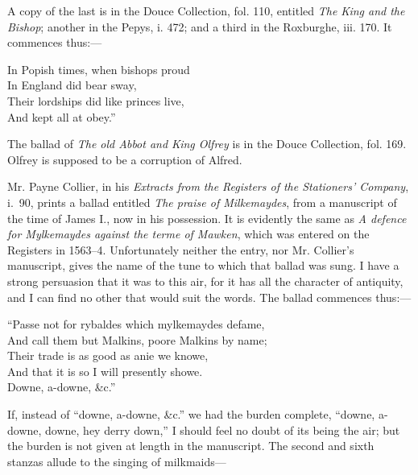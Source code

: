 A copy of the last is in the Douce Collection, fol. 110, entitled \textit{The King and
the Bishop}; another in the Pepys, i. 472; and a third in the Roxburghe, iii. 170.
It commences thus:—
\settowidth{\versewidth}{In Popish times, when bishops proud}
\begin{scverse}
\begin{altverse}
In Popish times, when bishops proud\\
In England did bear sway,\\
Their lordships did like princes live,\\
And kept all at obey.”
\end{altverse}
\end{scverse}

The ballad of \textit{The old Abbot and King Olfrey} is in the Douce Collection, fol. 169.
Olfrey is supposed to be a corruption of Alfred.

Mr. Payne Collier, in his \textit{Extracts from the Registers of the Stationers’
Company}, i.~90, prints a ballad entitled \textit{The praise of Milkemaydes}, from
a manuscript of the time of James I., now in his possession. It is evidently the
same as \textit{A defence for Mylkemaydes against the terme of Mawken}, which was
entered on the Registers in 1563–4. Unfortunately neither the entry, nor Mr.
Collier’s manuscript, gives the name of the tune to which that ballad was sung.
I have a strong persuasion that it was to this air, for it has all the character of
antiquity, and I can find no other that would suit the words. The ballad
commences thus:—

\settowidth{\versewidth}{Passe not for rybaldes which mylkemaydes defame,}
\begin{scverse}
“Passe not for rybaldes which mylkemaydes defame,\\
And call them but Malkins, poore Malkins by name;\\
Their trade is as good as anie we knowe,\\
And that it is so I will presently showe.\\
\attribution Downe, a-downe, \&c.”
\end{scverse}

If, instead of “downe, a-downe, \&c.” we had the burden complete, “downe,
a-downe, downe, hey derry down,” I should feel no doubt of its being the air;
but the burden is not given at length in the manuscript. The second and sixth
stanzas allude to the singing of milkmaids—

